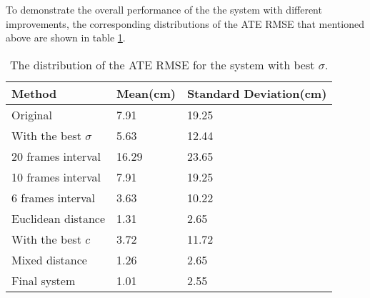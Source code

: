 To demonstrate the overall performance of the the system with different improvements, the corresponding distributions of the ATE RMSE that mentioned above are shown in table \ref{ATE_RMSE_Distribution}.
\begin{table}[htb]
    \caption{The distribution of the ATE RMSE for the system with best $\sigma$.}
    \centering
    \begin{tabular}{p{4cm}|p{2cm}|p{4.5cm}}
        \toprule
        Method& Mean(cm)& Standard Deviation(cm)\\
        \bottomrule
        Original& 7.91& 19.25 \\
        \hline
        With the best $\sigma$& 5.63& 12.44 \\
        \bottomrule
        20 frames interval&16.29&23.65\\
        \hline
        10 frames interval&7.91&19.25\\
        \hline
        6 frames interval&3.63&10.22\\
        \bottomrule
        Euclidean distance& 1.31& 2.65 \\
        \hline
        With the best $c$&3.72&11.72 \\
        \hline
        Mixed distance& 1.26& 2.65 \\
        \hline
        Final system&1.01& 2.55 \\
        \bottomrule
    \end{tabular}
    \label{ATE_RMSE_Distribution}
\end{table}

